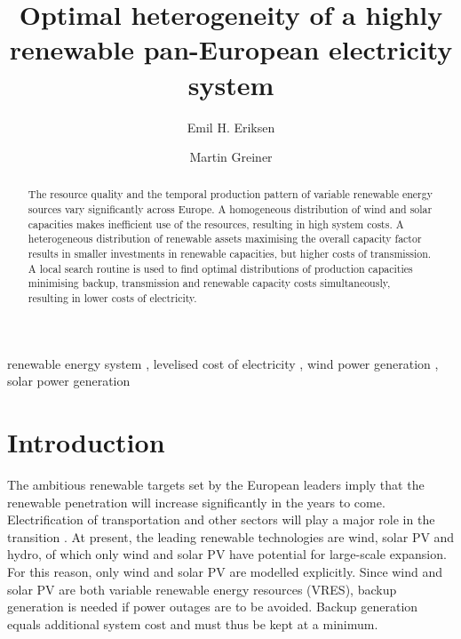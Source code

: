 \documentclass[a4paper, 5p, sort&compress]{elsarticle}%
\begin{document}
\begin{frontmatter}

\title{Optimal heterogeneity of a highly renewable pan-European electricity system}

\author[label1]{Emil H. Eriksen}
\author[label2,label3]{Martin Greiner}
\address[label1]{Department of Physics and Astronomy, Aarhus University, 8000 Aarhus C,  Denmark}
\address[label2]{Department of Mathematics, Aarhus University, 8000 Aarhus C,  Denmark}
\address[label3]{Department of Engineering, Aarhus University, 8200 Aarhus,  Denmark}


\begin{abstract}
  The resource quality and the temporal production pattern of variable
  renewable energy sources vary significantly across Europe. A
  homogeneous distribution of wind and solar capacities makes
  inefficient use of the resources, resulting in high system costs. A
  heterogeneous distribution of renewable assets maximising the
  overall capacity factor results in smaller investments in renewable
  capacities, but higher costs of transmission. A local search routine
  is used to find optimal distributions of production capacities
  minimising backup, transmission and renewable capacity costs
  simultaneously, resulting in lower costs of electricity.
\end{abstract}

\begin{keyword}
renewable energy system \sep 
levelised cost of electricity \sep
wind power generation \sep
solar power generation 
\end{keyword}

\end{frontmatter}


\section{Introduction}
\label{sec:one}

The ambitious renewable targets set by the European leaders
\cite{eu2050} imply that the renewable penetration will increase
significantly in the years to come. Electrification of transportation
and other sectors will play a major role in the transition
\cite{Williams12,ecf2050}. At present, the leading renewable
technologies are wind, solar PV and hydro, of which only wind and
solar PV have potential for large-scale expansion. For this reason,
only wind and solar PV are modelled explicitly. Since wind and
solar PV are both variable renewable energy resources (VRES), backup
generation is needed if power outages are to be avoided. Backup
generation equals additional system cost and must thus be kept at a
minimum.
\end{document}
